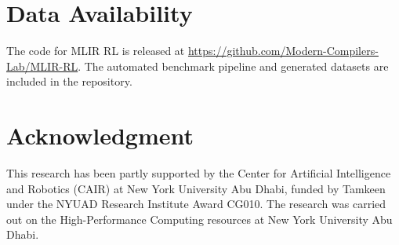 \documentclass[10pt,twocolumn]{article}
\begin{document}
\section{Data Availability}

The code for MLIR RL is released at \url{https://github.com/Modern-Compilers-Lab/MLIR-RL}. The automated benchmark pipeline and generated datasets are included in the repository.

\section*{Acknowledgment}

This research has been partly supported by the Center for Artificial Intelligence and Robotics (CAIR) at New York University Abu Dhabi, funded by Tamkeen under the NYUAD Research Institute Award CG010. The research was carried out on the High-Performance Computing resources at New York University Abu Dhabi.
\end{document}
